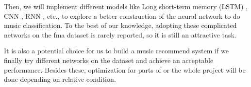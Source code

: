 \documentclass{article}
\begin{document}
Then, we will implement different models like Long short-term memory (LSTM) \cite{sundermeyer2012lstm}, CNN \cite{lawrence1997face}, RNN \cite{medsker2001recurrent}, etc., to explore a better construction of the neural network to do music classification. To the best of our knowledge, adopting these complicated networks on the fma dataset is rarely reported, so it is still an attractive task. 

It is also a potential choice for us to build a music recommend system if we finally try different networks on the dataset and achieve an acceptable performance. Besides these, optimization for parts of or the whole project will be done depending on relative condition.
 


\end{document}
